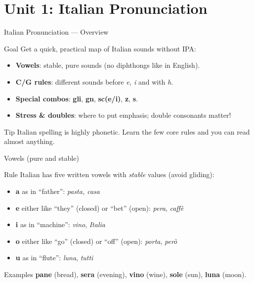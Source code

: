 \section{Unit 1: Italian Pronunciation}

\blueheader
\begin{frame}{Italian Pronunciation — Overview}
\begin{blue*}{Goal}
Get a quick, practical map of Italian sounds without IPA:
\begin{itemize}
  \item \textbf{Vowels}: stable, pure sounds (no diphthongs like in English).
  \item \textbf{C/G rules}: different sounds before \textit{e, i} and with \textit{h}.
  \item \textbf{Special combos}: \textbf{gli}, \textbf{gn}, \textbf{sc(e/i)}, \textbf{z}, \textbf{s}.
  \item \textbf{Stress \& doubles}: where to put emphasis; double consonants matter!
\end{itemize}
\end{blue*}

\begin{green*}{Tip}
Italian spelling is highly phonetic. Learn the few core rules and you can read almost anything.
\end{green*}
\end{frame}

\blueheader
\begin{frame}{Vowels (pure and stable)}
\begin{red*}{Rule}
Italian has five written vowels with \emph{stable} values (avoid gliding):
\begin{itemize}
  \item \textbf{a} as in “father”: \textit{pasta, casa}
  \item \textbf{e} either like “they” (closed) or “bet” (open): \textit{pera}, \textit{caffè}
  \item \textbf{i} as in “machine”: \textit{vino}, \textit{Italia}
  \item \textbf{o} either like “go” (closed) or “off” (open): \textit{porta}, \textit{però}
  \item \textbf{u} as in “flute”: \textit{luna}, \textit{tutti}
\end{itemize}
\end{red*}

\begin{green*}{Examples}
\textbf{pane} (bread), \textbf{sera} (evening), \textbf{vino} (wine), \textbf{sole} (sun), \textbf{luna} (moon).
\end{green*}
\end{frame}

